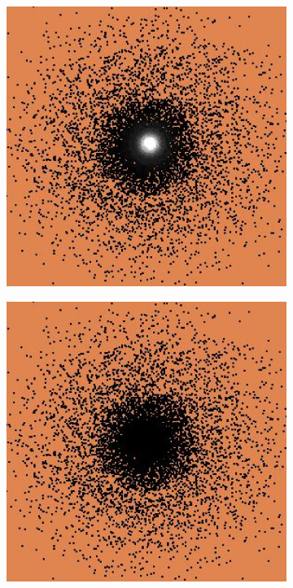 \documentclass[../taasin.tex]{subfiles}
\begin{document}
\begin{figure}
    \centering
    \begin{subfigure}[b]{0.20\textwidth}
        \centering
        \includegraphics[width=\textwidth]{figures/fixation1.pdf}
        \caption{}
    \end{subfigure}
    \hfill
    \centering
    \begin{subfigure}[b]{0.20\textwidth}
        \centering
        \includegraphics[width=\textwidth]{figures/fixation2.pdf}

\end{subfigure}
\end{figure}
\end{document}
